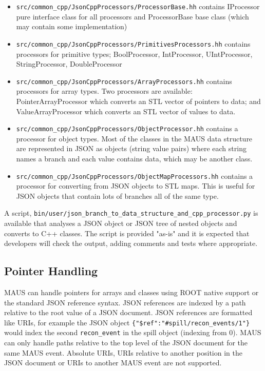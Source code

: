 \begin{itemize}
\item \verb|src/common_cpp/JsonCppProcessors/ProcessorBase.hh| contains IProcessor pure interface class for all processors and ProcessorBase base class (which may contain some implementation)
\item \verb|src/common_cpp/JsonCppProcessors/PrimitivesProcessors.hh| contains processors for primitive types; BoolProcessor, IntProcessor, UIntProcessor, StringProcessor, DoubleProcessor
\item \verb|src/common_cpp/JsonCppProcessors/ArrayProcessors.hh| contains processors for array types. Two processors are available: PointerArrayProcessor which converts an STL vector of pointers to data; and ValueArrayProcessor which converts an STL vector of values to data.
\item \verb|src/common_cpp/JsonCppProcessors/ObjectProcessor.hh| contains a processor for object types. Most of the classes in the MAUS data structure are represented in JSON as objects (string value pairs) where each string names a branch and each value contains data, which may be another class.
\item \verb|src/common_cpp/JsonCppProcessors/ObjectMapProcessors.hh| contains a processor for converting from JSON objects to STL maps. This is useful for JSON objects that contain lots of branches all of the same type.
\end{itemize}

A script, \verb|bin/user/json_branch_to_data_structure_and_cpp_processor.py| is available that analyses a JSON object or JSON tree of nested objects and converts to C++ classes. The script is provided "as-is" and it is expected that developers will check the output, adding comments and tests where appropriate.

\subsection{Pointer Handling}
MAUS can handle pointers for arrays and classes using ROOT native support or the standard JSON reference syntax. JSON references are indexed by a path relative to the root value of a JSON document. JSON references are formatted like URIs, for example the JSON object \verb|{"$ref":"#spill/recon_events/1"}| would index the second \verb|recon_event| in the spill object (indexing from 0). MAUS can only handle paths relative to the top level of the JSON document for the same MAUS event. Absolute URIs, URIs relative to another position in the JSON document or URIs to another MAUS event are not supported. 

